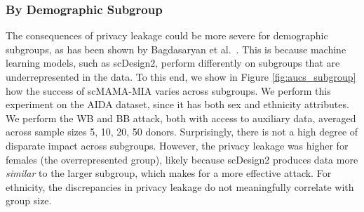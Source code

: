 \documentclass[unnumsec,webpdf,contemporary,large]{oup-authoring-template}%
\theoremstyle{thmstyleone}%
\theoremstyle{thmstyletwo}%
\theoremstyle{thmstylethree}%
\begin{document}
\subsubsection{By Demographic Subgroup}

The consequences of privacy leakage could be more severe for demographic subgroups, as has been shown by Bagdasaryan et al.~\cite{bagdasaryan2019differential}. This is because machine learning models, such as scDesign2, perform differently on subgroups that are underrepresented in the data. To this end, we show in Figure \ref{fig:aucs_subgroup} how the success of scMAMA-MIA varies across subgroups. We perform this experiment on the AIDA dataset, since it has both sex and ethnicity attributes. We perform the WB and BB attack, both with access to auxiliary data, averaged across sample sizes 5, 10, 20, 50 donors. Surprisingly, there is not a high degree of disparate impact across subgroups. However, the privacy leakage was higher for females (the overrepresented group), likely because scDesign2 produces data more \textit{similar} to the larger subgroup, which makes for a more effective attack. For ethnicity, the discrepancies in privacy leakage do not meaningfully correlate with group size.
\end{document}
